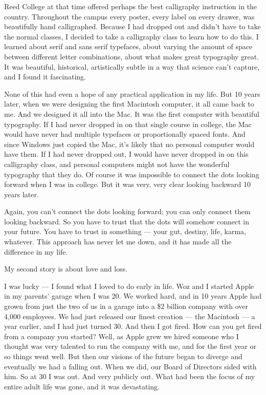 \documentclass{ltjsarticle}
\begin{document}
Reed College at that time offered perhaps the best calligraphy instruction in the country. Throughout the campus every poster, every label on every drawer, was beautifully hand calligraphed. Because I had dropped out and didn’t have to take the normal classes, I decided to take a calligraphy class to learn how to do this. I learned about serif and sans serif typefaces, about varying the amount of space between different letter combinations, about what makes great typography great. It was beautiful, historical, artistically subtle in a way that science can’t capture, and I found it fascinating.

None of this had even a hope of any practical application in my life. But 10 years later, when we were designing the first Macintosh computer, it all came back to me. And we designed it all into the Mac. It was the first computer with beautiful typography. If I had never dropped in on that single course in college, the Mac would have never had multiple typefaces or proportionally spaced fonts. And since Windows just copied the Mac, it’s likely that no personal computer would have them. If I had never dropped out, I would have never dropped in on this calligraphy class, and personal computers might not have the wonderful typography that they do. Of course it was impossible to connect the dots looking forward when I was in college. But it was very, very clear looking backward 10 years later.

Again, you can’t connect the dots looking forward; you can only connect them looking backward. So you have to trust that the dots will somehow connect in your future. You have to trust in something — your gut, destiny, life, karma, whatever. This approach has never let me down, and it has made all the difference in my life.

My second story is about love and loss.

I was lucky — I found what I loved to do early in life. Woz and I started Apple in my parents’ garage when I was 20. We worked hard, and in 10 years Apple had grown from just the two of us in a garage into a \$2 billion company with over 4,000 employees. We had just released our finest creation — the Macintosh — a year earlier, and I had just turned 30. And then I got fired. How can you get fired from a company you started? Well, as Apple grew we hired someone who I thought was very talented to run the company with me, and for the first year or so things went well. But then our visions of the future began to diverge and eventually we had a falling out. When we did, our Board of Directors sided with him. So at 30 I was out. And very publicly out. What had been the focus of my entire adult life was gone, and it was devastating.
\end{document}
